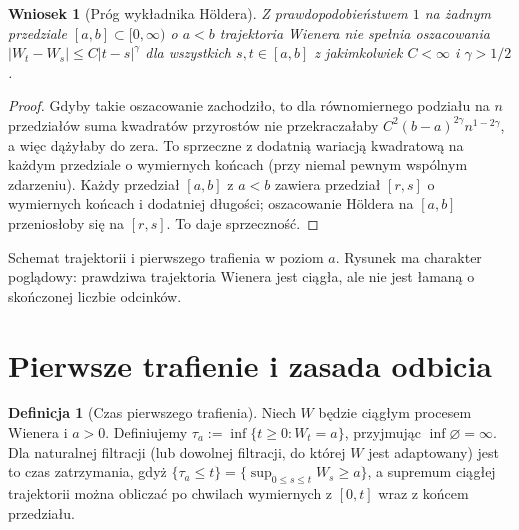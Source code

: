 \documentclass[11pt,a4paper,oneside]{report}
\numberwithin{equation}{chapter}
\theoremstyle{plain}
\newtheorem{wniosek}[twierdzenie]{Wniosek}
\theoremstyle{definition}
\newtheorem{definicja}{Definicja}[chapter]
\theoremstyle{remark}
\begin{document}
\begin{wniosek}[Próg wykładnika H\"oldera]
Z prawdopodobieństwem $1$ na żadnym przedziale
$[a,b]\subset[0,\infty)$ o $a<b$ trajektoria Wienera
nie spełnia oszacowania
$|W_t-W_s|\le C|t-s|^\gamma$ dla wszystkich $s,t\in[a,b]$
z jakimkolwiek $C<\infty$ i $\gamma>1/2$.
\end{wniosek}
\begin{proof}
Gdyby takie oszacowanie zachodziło, to dla równomiernego
podziału na $n$ przedziałów suma kwadratów przyrostów
nie przekraczałaby $C^2(b-a)^{2\gamma}n^{1-2\gamma}$,
a więc dążyłaby do zera. To sprzeczne z dodatnią
wariacją kwadratową na każdym przedziale o wymiernych
końcach (przy niemal pewnym wspólnym zdarzeniu).
Każdy przedział $[a,b]$ z $a<b$ zawiera przedział
$[r,s]$ o wymiernych końcach i dodatniej długości;
oszacowanie H\"oldera na $[a,b]$ przeniosłoby się na
$[r,s]$. To daje sprzeczność.
\end{proof}

\begin{center}
\par\smallskip\small Schemat trajektorii i pierwszego trafienia w poziom $a$.
Rysunek ma charakter poglądowy: prawdziwa trajektoria Wienera
jest ciągła, ale nie jest łamaną o skończonej liczbie odcinków.
\end{center}

\section{Pierwsze trafienie i zasada odbicia}
\begin{definicja}[Czas pierwszego trafienia]
Niech $W$ będzie ciągłym procesem Wienera i $a>0$.
Definiujemy $\tau_a:=\inf\{t\ge0:W_t=a\}$,
przyjmując $\inf\varnothing=\infty$.
Dla naturalnej filtracji (lub dowolnej filtracji, do której
$W$ jest adaptowany) jest to czas zatrzymania, gdyż
$\{\tau_a\le t\}=\{\sup_{0\le s\le t}W_s\ge a\}$,
a supremum ciągłej trajektorii można obliczać po
chwilach wymiernych z $[0,t]$ wraz z końcem przedziału.
\end{definicja}
\end{document}
